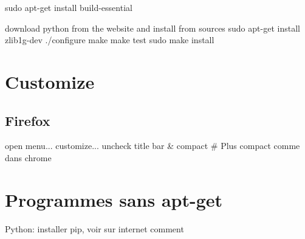 \documentclass{article}
\begin{document}
sudo apt-get install build-essential

download python from the website and install from sources
sudo apt-get install zlib1g-dev
./configure
make
make test
sudo make install

\section{Customize}

\subsection{Firefox}
  open menu... customize... uncheck title bar & compact # Plus compact comme dans chrome

\section{Programmes sans apt-get}

Python: installer pip, voir sur internet comment
\end{document}
